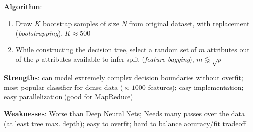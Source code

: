     \textbf{Algorithm}:
    \begin{enumerate}
      \item Draw $K$ bootstrap samples of size $N$ from original dataset, with replacement (\emph{bootstrapping}), $K\approx 500$
      \item While constructing the decision tree, select a random set of $m$ attributes out of the $p$ attributes available to infer split (\emph{feature bagging}), $m\lessapprox\sqrt{p}$
    \end{enumerate}

    \textbf{Strengths}: can model extremely complex decision boundaries without overfit; most popular classifier for dense data ($\approx 1000$ features); easy implementation; easy parallelization (good for MapReduce)

    \textbf{Weaknesses}: Worse than Deep Neural Nets; Needs many passes over the data (at least tree max. depth); easy to overfit; hard to balance accuracy/fit tradeoff

